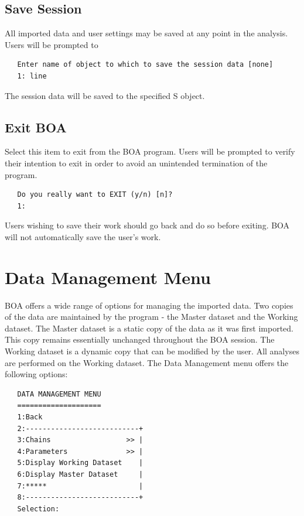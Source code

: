 \documentclass[12pt,letterpaper]{report}
\begin{document}
\section{Save Session}
\noindent
All imported data and user settings may be saved at any point in the analysis.
Users will be prompted to
\vskip 9pt
\begin{tiny}
\begin{verbatim}
   Enter name of object to which to save the session data [none]
   1: line
\end{verbatim}
\end{tiny}
The session data will be saved to the specified S object.

\section{Exit BOA}
\noindent
Select this item to exit from the BOA program. Users will be prompted to verify
their intention to exit in order to avoid an unintended termination of the
program.
\vskip 9pt
\begin{tiny}
\begin{verbatim}
   Do you really want to EXIT (y/n) [n]?
   1:
\end{verbatim}
\end{tiny}
Users wishing to save their work should go back and do so before exiting. BOA
will not automatically save the user's work.

\chapter{Data Management Menu}
\noindent
BOA offers a wide range of options for managing the imported data. Two copies of
the data are maintained by the program - the Master dataset and the Working
dataset. The Master dataset is a static copy of the data as it was first
imported. This copy remains essentially unchanged throughout the BOA session.
The Working dataset is a dynamic copy that can be modified by the user. All
analyses are performed on the Working dataset. The Data Management menu offers
the following options:
\vskip 9pt
\begin{tiny}
\begin{verbatim}
   DATA MANAGEMENT MENU
   ====================
   1:Back
   2:---------------------------+
   3:Chains                  >> |
   4:Parameters              >> |
   5:Display Working Dataset    |
   6:Display Master Dataset     |
   7:*****                      |
   8:---------------------------+
   Selection:
\end{verbatim}
\end{tiny}
\end{document}
